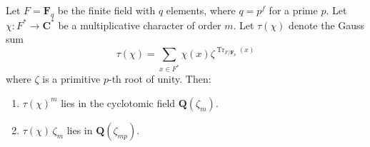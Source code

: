 Let $F = \mathbf{F}_q$ be the finite field with $q$ elements, where $q = p^f$ for a prime $p$. Let $\chi: F^* \to \mathbf{C}^*$ be a multiplicative character of order $m$. Let $\tau(\chi)$ denote the Gauss sum
$$\tau(\chi) = \sum_{x \in F^*} \chi(x) \zeta^{\operatorname{Tr}_{F/\mathbf{F}_p}(x)}$$
where $\zeta$ is a primitive $p$-th root of unity. Then:
\begin{enumerate}
\item $\tau(\chi)^m$ lies in the cyclotomic field $\mathbf{Q}(\zeta_m)$.
\item $\tau(\chi)\,\zeta_m$ lies in $\mathbf{Q}(\zeta_{mp})$.
\end{enumerate}
